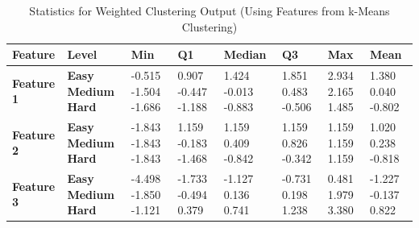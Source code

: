 \documentclass[12pt]{article}
\begin{document}
	\begin{center}
	\begin{table}[h]
		\begin{tabular}{ | m{2cm} | m{1.7cm} | m{1.3cm} | m{1.3cm} | m{1.5cm} | m{1.3cm} | m{1.3cm} | m{1.3cm} | }
		\hline
		\textbf{Feature} & \textbf{Level} & \textbf{Min} & \textbf{Q1} & \textbf{Median} & \textbf{Q3} & \textbf{Max} & \textbf{Mean}\\ 
		\hline
		\textbf{Feature 1} & \textbf{Easy Medium Hard} & -0.515 \hspace{5mm}-1.504 \hspace{5mm}-1.686 & 0.907 \hspace{5mm}-0.447 \hspace{5mm}-1.188 & 1.424  \hspace{5mm}-0.013 \hspace{5mm}-0.883 & 1.851 \hspace{5mm}0.483 \hspace{5mm}-0.506 & 2.934 \hspace{5mm}2.165 \hspace{5mm}1.485 & 1.380 \hspace{5mm}0.040 \hspace{5mm}-0.802\\
		\hline
		\textbf{Feature 2} & \textbf{Easy Medium Hard} & -1.843 \hspace{5mm}-1.843 \hspace{5mm}-1.843 & 1.159 \hspace{5mm}-0.183 \hspace{5mm}-1.468 & 1.159  \hspace{5mm}0.409 \hspace{5mm}-0.842 & 1.159 \hspace{5mm}0.826 \hspace{5mm}-0.342 & 1.159 \hspace{5mm}1.159 \hspace{5mm}1.159 & 1.020 \hspace{5mm}0.238 \hspace{5mm}-0.818\\
		\hline
		\textbf{Feature 3} & \textbf{Easy Medium Hard} & -4.498 \hspace{5mm}-1.850 \hspace{5mm}-1.121 & -1.733 \hspace{5mm}-0.494 \hspace{5mm}0.379 & -1.127  \hspace{5mm}0.136 \hspace{5mm}0.741 & -0.731 \hspace{5mm}0.198 \hspace{5mm}1.238 & 0.481 \hspace{5mm}1.979 \hspace{5mm}3.380 & -1.227 \hspace{5mm}-0.137 \hspace{5mm}0.822\\
		\hline
		\end{tabular}
		\caption{Statistics for Weighted Clustering Output (Using Features from k-Means Clustering)}
	\end{table}
	\end{center}
	
\end{document}
